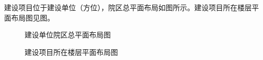 建设项目位于建设单位（方位），院区总平面布局如图所示。建设项目所在楼层平面布局图见图。

\begin{figure}[H]
\centering
{}
\caption{建设单位院区总平面布局图}
\label{fig:ch2-campus-plan}
\end{figure}

\begin{figure}[H]
\centering
{}
\caption{建设项目所在楼层平面布局图}
\label{fig:ch2-floor-plan}
\end{figure}
